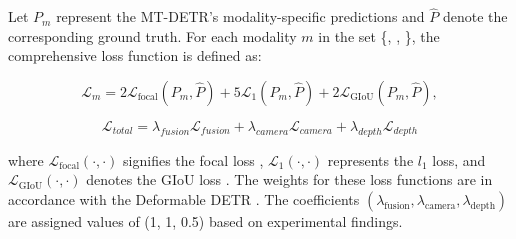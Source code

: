 \documentclass[report.tex]{subfiles}
\begin{document}
    Let \( P_m \) represent the MT-DETR's modality-specific predictions and \( \hat{P} \) denote the corresponding ground truth. For each modality \( m \) in the set \{, , \}, the comprehensive loss function is defined as:

    \begin{equation}
        \mathcal{L}_m = 2\mathcal{L}_{\text{focal}}(P_m, \hat{P}) + 5\mathcal{L}_1(P_m, \hat{P}) + 2\mathcal{L}_{\text{GIoU}}(P_m, \hat{P}),
    \end{equation}

    \begin{equation}
        \mathcal{L}_{total} = \lambda_{fusion}\mathcal{L}_{fusion} + \lambda_{camera}\mathcal{L}_{camera} + \lambda_{depth}\mathcal{L}_{depth}
    \end{equation}

    where \( \mathcal{L}_{\text{focal}}(\cdot,\cdot) \) signifies the focal loss \cite{lin2017focal}, \( \mathcal{L}_1(\cdot,\cdot) \) represents the \( l_1 \) loss, and \( \mathcal{L}_{\text{GIoU}}(\cdot,\cdot) \) denotes the GIoU loss \cite{rezatofighi2019generalized}. The weights for these loss functions are in accordance with the Deformable DETR \cite{zhu2021deformable}. The coefficients \( (\lambda_{\text{fusion}}, \lambda_{\text{camera}}, \lambda_{\text{depth}}) \) are assigned values of (1, 1, 0.5) based on experimental findings.













    
\end{document}

